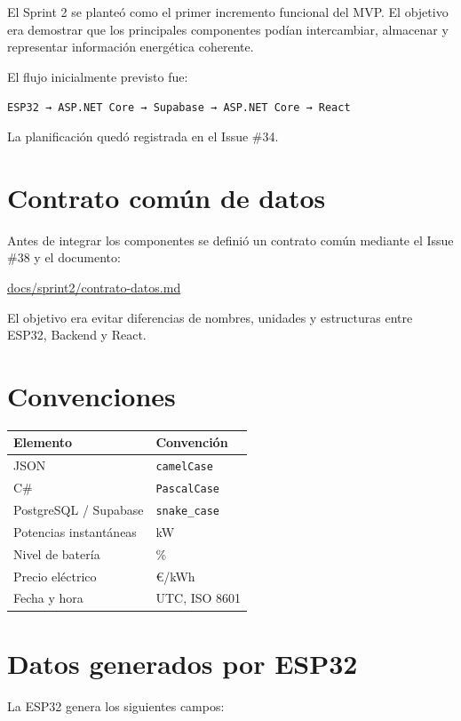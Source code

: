 \documentclass[11pt,a4paper,oneside]{report}
\newcommand{\src}[2]{\href{#1}{#2}}
\begin{document}
El Sprint 2 se planteó como el primer incremento funcional del MVP. El objetivo era demostrar que los principales componentes podían intercambiar, almacenar y representar información energética coherente.

El flujo inicialmente previsto fue:

\begin{center}
\texttt{ESP32 → ASP.NET Core → Supabase → ASP.NET Core → React}
\end{center}

La planificación quedó registrada en el Issue \#34.

\section{Contrato común de datos}

Antes de integrar los componentes se definió un contrato común mediante el Issue \#38 y el documento:

\src{https://github.com/rrrarrra9/AhorraTenergia/blob/main/docs/sprint2/contrato-datos.md}{docs/sprint2/contrato-datos.md}

El objetivo era evitar diferencias de nombres, unidades y estructuras entre ESP32, Backend y React.

\section{Convenciones}

\begin{tabularx}{\linewidth}{@{}p{4.2cm}X@{}}
\toprule
\textbf{Elemento} & \textbf{Convención} \\
\midrule
JSON & \texttt{camelCase} \\
C\# & \texttt{PascalCase} \\
PostgreSQL / Supabase & \texttt{snake\_case} \\
Potencias instantáneas & kW \\
Nivel de batería & \% \\
Precio eléctrico & €/kWh \\
Fecha y hora & UTC, ISO 8601 \\
\bottomrule
\end{tabularx}

\section{Datos generados por ESP32}

La ESP32 genera los siguientes campos:
\end{document}
